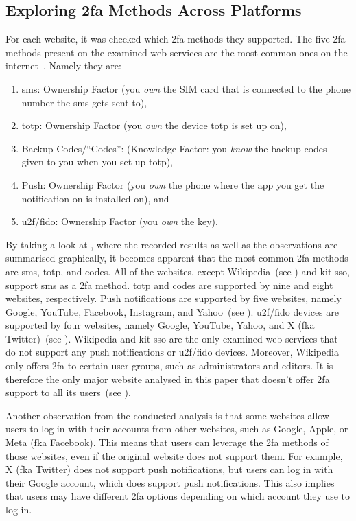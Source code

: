 \subsection{Exploring \acs{2fa} Methods Across Platforms}
\label{sec:choice:exploring}

For each website, it was checked which \ac{2fa} methods they supported. The five \ac{2fa} methods present on the examined web services are the most common ones on the internet~\cite{reese_2019}. Namely they are:

\begin{enumerate}
    \item \acf{sms}: Ownership Factor (you \textit{own} the SIM card that is connected to the phone number the \ac{sms} gets sent to),
    \item \acf{totp}: Ownership Factor (you \textit{own} the device \ac{totp} is set up on),
    \item Backup Codes/\enquote{Codes}: (Knowledge Factor: you \textit{know} the backup codes given to you when you set up \ac{totp}),
    \item Push: Ownership Factor (you \textit{own} the phone where the app you get the notification on is installed on), and
    \item \acf{u2f}/\acf{fido}: Ownership Factor (you \textit{own} the key).
\end{enumerate}

\pspace{}By taking a look at , where the recorded results as well as the observations are summarised graphically, it becomes apparent that the most common \ac{2fa} methods are \ac{sms}, \ac{totp}, and codes. All of the websites, except Wikipedia~(see ) and \ac{kit} \ac{sso}, support \ac{sms} as a \ac{2fa} method. \ac{totp} and codes are supported by nine and eight websites, respectively. Push notifications are supported by five websites, namely Google, YouTube, Facebook, Instagram, and Yahoo~(see ). \ac{u2f}/\ac{fido} devices are supported by four websites, namely Google, YouTube, Yahoo, and X (fka Twitter)~(see ). Wikipedia and \ac{kit} \ac{sso} are the only examined web services that do not support any push notifications or \ac{u2f}/\ac{fido} devices. Moreover, Wikipedia only offers \ac{2fa} to certain user groups, such as administrators and editors. It is therefore the only major website analysed in this paper that doesn't offer \ac{2fa} support to all its users~(see ).

\pspace{}Another observation from the conducted analysis is that some websites allow users to log in with their accounts from other websites, such as Google, Apple, or Meta (fka Facebook). This means that users can leverage the \ac{2fa} methods of those websites, even if the original website does not support them. For example, X (fka Twitter) does not support push notifications, but users can log in with their Google account, which does support push notifications. This also implies that users may have different \ac{2fa} options depending on which account they use to log in.

